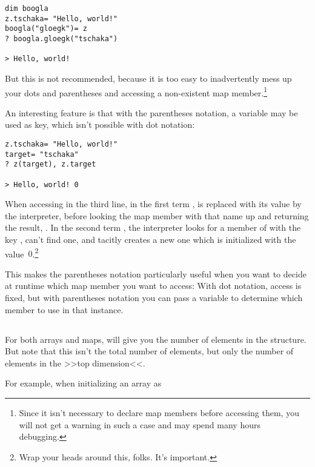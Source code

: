 \begin{lstlisting}
dim boogla
z.tschaka= "Hello, world!"
boogla("gloegk")= z
? boogla.gloegk("tschaka")

> Hello, world!
\end{lstlisting}

But this is not recommended, because it is too easy to inadvertently
mess up your dots and parentheses and accessing a non-existent map
member.\footnote{Since it isn't necessary to declare map members before
accessing them, you will not get a warning in such a case and may spend
many hours debugging.}

An interesting feature is that with the parentheses notation, a variable
may be used as key, which isn't possible with dot notation:

\begin{lstlisting}
z.tschaka= "Hello, world!"
target= "tschaka"
? z(target), z.target

> Hello, world!	0
\end{lstlisting}

When accessing  in the third line, in the first term
,  is replaced with its value  by
the interpreter, before looking the map member with that name up and
returning the result, . In the second term
, the interpreter looks for a member of  with the key
, can't find one, and tacitly creates a new one which is
initialized with the value~$0$.\footnote{Wrap your heads around this,
folks. It's important.}

This makes the parentheses notation particularly useful when you want to
decide at runtime which map member you want to access: With dot
notation, access is fixed, but with parentheses notation you can pass a
variable to determine which member to use in that instance.

\subsection{ \label{cLen}}

For both arrays and maps,  will give you the number of
elements in the structure. But note that this isn't the total number of
elements, but only the number of elements in the >>top dimension<<.

For example, when initializing an array as

